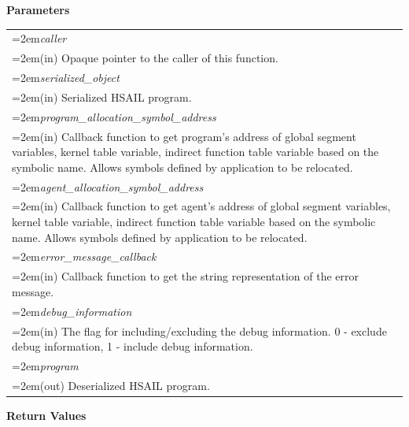 \documentclass[final,oneside]{book}
\newcommand{\hsaarg}[1]{\textit{#1}}
\begin{document}
\noindent\textbf{Parameters}\\[-6mm]
\noindent\begin{longtable}{@{}>{\hangindent=2em}p{\textwidth}}
\hsaarg{caller}\\\hspace{2em}(in) Opaque pointer to the caller of this function.\\[2mm]
\hsaarg{serialized_\-object}\\\hspace{2em}(in) Serialized HSAIL program.\\[2mm]
\hsaarg{program_\-allocation_\-symbol_\-address}\\\hspace{2em}(in) Callback function to get program's address of global segment variables, kernel table variable, indirect function table variable based on the symbolic name. Allows symbols defined by application to be relocated.\\[2mm]
\hsaarg{agent_\-allocation_\-symbol_\-address}\\\hspace{2em}(in) Callback function to get agent's address of global segment variables, kernel table variable, indirect function table variable based on the symbolic name. Allows symbols defined by application to be relocated.\\[2mm]
\hsaarg{error_\-message_\-callback}\\\hspace{2em}(in) Callback function to get the string representation of the error message.\\[2mm]
\hsaarg{debug_\-information}\\\hspace{2em}(in) The flag for including/excluding the debug information. 0 - exclude debug information, 1 - include debug information.\\[2mm]
\hsaarg{program}\\\hspace{2em}(out) Deserialized HSAIL program.
\end{longtable}
\vspace{-5mm}\noindent\textbf{Return Values}\\[-6mm]
\end{document}

